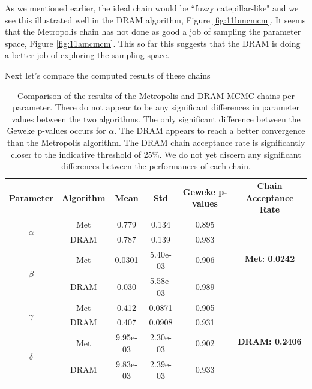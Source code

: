 As we mentioned earlier, the ideal chain would be ``fuzzy catepillar-like" and we see this illustrated well in the DRAM algorithm, Figure \ref{fig:11bmcmcm}. It seems that the Metropolis chain has not done as good a job of sampling the parameter space, Figure \ref{fig:11amcmcm}. This so far this suggests that the DRAM is doing a better job of exploring the sampling space.
\par Next let's compare the computed results of these chains
\begin{table}[H]
\centering
        \begin{tabular}{c | c | c c | c || c}
            \cline{1-6}
           \textbf{Parameter} & \textbf{Algorithm} &  \textbf{Mean} & \textbf{Std} &  \textbf{Geweke p-values} & \textbf{Chain Acceptance Rate}\\ 
            \cline{1-6}
            
            \multirow{2}{*}{\textbf{$\alpha$}} & Met & 0.779 & 0.134 & 0.895 & \multirow{4}{*}{\textbf{Met: 0.0242}}\\
            & DRAM & 0.787 & 0.139 & 0.983 & \\\cline{1-5}
            \multirow{2}{*}{\textbf{$\beta$}} & Met & 0.0301 & 5.40e-03 & 0.906 \\
            & DRAM & 0.030 & 5.58e-03 & 0.989 & \\ \cline{1-5}
            \multirow{2}{*}{\textbf{$\gamma$}} & Met & 0.412 & 0.0871 & 0.905 & \multirow{4}{*}{\textbf{DRAM: 0.2406}}\\
            & DRAM & 0.407 & 0.0908 & 0.931\\ \cline{1-5}
            \multirow{2}{*}{\textbf{$\delta$}} & Met & 9.95e-03 & 2.30e-03 & 0.902\\
            & DRAM & 9.83e-03 & 2.39e-03 & 0.933
             \\\hline
             \hline
        \end{tabular}
    \caption{Comparison of the results of the Metropolis and DRAM MCMC chains per parameter. There do not appear to be any significant differences in parameter values between the two algorithms. The only significant difference between the Geweke p-values occurs for $\alpha$. The DRAM appears to reach a better convergence than the Metropolis algorithm. The DRAM chain acceptance rate is significantly closer to the indicative threshold of 25\%. We do not yet discern any significant differences between the performances of each chain.}
    \label{tab:3mcmc}
\end{table}


